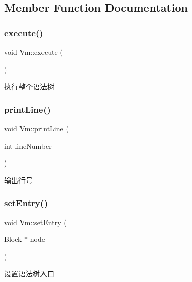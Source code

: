 \subsection{Member Function Documentation}
\mbox{\label{class_vm_a37a0791ef2b63e41421446993d0e7e4d}} 
\subsubsection{\texorpdfstring{execute()}{execute()}}
{\footnotesize\ttfamily void Vm\+::execute (\begin{DoxyParamCaption}{ }\end{DoxyParamCaption})}



执行整个语法树 

\mbox{\label{class_vm_a376141bb4182218ac7a499043eb18a6c}} 
\subsubsection{\texorpdfstring{print\+Line()}{printLine()}}
{\footnotesize\ttfamily void Vm\+::print\+Line (\begin{DoxyParamCaption}\item[{int}]{line\+Number }\end{DoxyParamCaption})\hspace{0.3cm}{\ttfamily [static]}}



输出行号 

\mbox{\label{class_vm_af036edc52fab207ca28530c06b6d0c67}} 
\subsubsection{\texorpdfstring{set\+Entry()}{setEntry()}}
{\footnotesize\ttfamily void Vm\+::set\+Entry (\begin{DoxyParamCaption}\item[{\hyperlink{class_block}{Block} $\ast$}]{node }\end{DoxyParamCaption})}



设置语法树入口 



